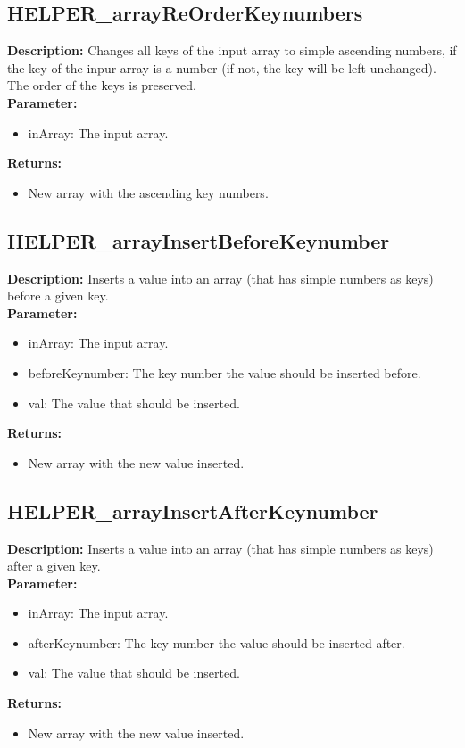 \subsection{HELPER\_arrayReOrderKeynumbers}
\textbf{Description:} Changes all keys of the input array to simple ascending numbers, if the key of the inpur array is a number (if not, the key will be left unchanged). The order of the keys is preserved.\\
\textbf{Parameter:}
\begin{itemize}
\item inArray: The input array.
\end{itemize}
\textbf{Returns:}
\begin{itemize}
\item New array with the ascending key numbers.
\end{itemize}

\subsection{HELPER\_arrayInsertBeforeKeynumber}
\textbf{Description:} Inserts a value into an array (that has simple numbers as keys) before a given key.\\
\textbf{Parameter:}
\begin{itemize}
\item inArray: The input array.
\item beforeKeynumber: The key number the value should be inserted before.
\item val: The value that should be inserted.
\end{itemize}
\textbf{Returns:}
\begin{itemize}
\item New array with the new value inserted.
\end{itemize}

\subsection{HELPER\_arrayInsertAfterKeynumber}
\textbf{Description:} Inserts a value into an array (that has simple numbers as keys) after a given key.\\
\textbf{Parameter:}
\begin{itemize}
\item inArray: The input array.
\item afterKeynumber: The key number the value should be inserted after.
\item val: The value that should be inserted.
\end{itemize}
\textbf{Returns:}
\begin{itemize}
\item New array with the new value inserted.
\end{itemize}

